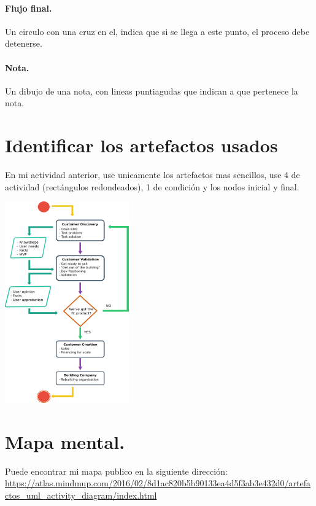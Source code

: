 \documentclass[spanish,12pt,letterpapper]{article}
\begin{document}
	\paragraph{Flujo final.} Un circulo con una cruz en el, indica que si se llega a este punto, el proceso debe detenerse.
	\paragraph{Nota.} Un dibujo de una nota, con lineas puntiagudas que indican a que pertenece la nota.
	
	\section{Identificar los artefactos usados}
	En mi actividad anterior, use unicamente los artefactos mas sencillos, use 4 de actividad (rectángulos redondeados), 1 de condición y los nodos inicial y final.\\
	
	\begin{center}
	\includegraphics[width=0.4\textwidth]{./diagram}~\\[0.5cm]
	\end{center}
	
	\section{Mapa mental.}
	Puede encontrar mi mapa publico en la siguiente dirección:\\
	\url{https://atlas.mindmup.com/2016/02/8d1ac820b5b90133ea4d5f3ab3e432d0/artefactos_uml_activity_diagram/index.html}
	
	
	
\end{document}
